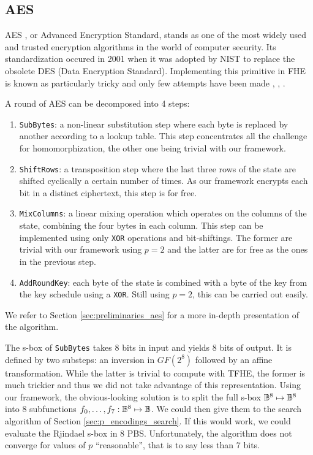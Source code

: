 \subsection{AES}
\label{sec:p_encodings_aes}


AES \cite{aes-original}, or Advanced Encryption Standard, stands as one of the most widely used and trusted encryption algorithms in the world of computer security. Its standardization occured in 2001 when it was adopted by NIST to replace the obsolete DES (Data Encryption Standard). Implementing this primitive in FHE is known as particularly tricky and only few attempts have been made \cite{C:GenHalSma12}, \cite{PKC:CorLepTib14}, \cite{DBLP:conf/wahc/TramaCBS23}.

A round of AES can be decomposed into 4 steps:
\begin{enumerate}
    \item \texttt{SubBytes}: a non-linear substitution step where each byte is replaced by another according to a lookup table. This step concentrates all the challenge for homomorphization, the other one being trivial with our framework.
    \item \texttt{ShiftRows}: a transposition step where the last three rows of the state are shifted cyclically a certain number of times. As our framework encrypts each bit in a distinct ciphertext, this step is for free.
    \item \texttt{MixColumns}: a linear mixing operation which operates on the columns of the state, combining the four bytes in each column. This step can be implemented using only \texttt{XOR} operations and bit-shiftings. The former are trivial with our framework using $p=2$ and the latter are for free as the ones in the previous step.
    \item \texttt{AddRoundKey}: each byte of the state is combined with a byte of the key from the key schedule using a \texttt{XOR}. Still using $p=2$, this can be carried out easily. 
\end{enumerate}

We refer to Section \ref{sec:preliminaries_aes} for a more in-depth presentation of the algorithm. 


 The s-box of \texttt{SubBytes} takes 8 bits in input and yields 8 bits of output. It is defined by two substeps: an inversion in $GF(2^8)$ followed by an affine transformation. While the latter is trivial to compute with TFHE, the former is much trickier and thus we did not take advantage of this representation. Using our framework, the obvious-looking solution is to split the full s-box $\mathbb{B}^8 \mapsto \mathbb{B}^8$ into 8 subfunctions $f_0, \dots, f_7: \mathbb{B}^8 \mapsto \mathbb{B}$. We could then give them to the search algorithm of Section \ref{sec:p_encodings_search}. If this would work, we could evaluate the Rjindael s-box in 8 PBS. Unfortunately, the algorithm does not converge for values of $p$ ``reasonable'', that is to say less than 7 bits. 


